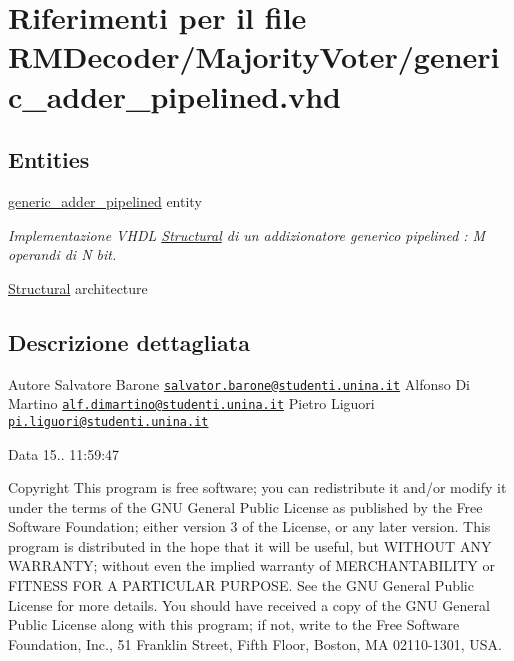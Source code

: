 \hypertarget{generic__adder__pipelined_8vhd}{\section{Riferimenti per il file R\+M\+Decoder/\+Majority\+Voter/generic\+\_\+adder\+\_\+pipelined.vhd}
\label{generic__adder__pipelined_8vhd}
}
\subsection*{Entities}
\begin{DoxyCompactItemize}
\item 
\hyperlink{classgeneric__adder__pipelined}{generic\+\_\+adder\+\_\+pipelined} entity
\begin{DoxyCompactList}\small\item\em Implementazione V\+H\+D\+L \hyperlink{classgeneric__adder__pipelined_1_1_structural}{Structural} di un addizionatore generico pipelined \+: M operandi di N bit. \end{DoxyCompactList}\item 
\hyperlink{classgeneric__adder__pipelined_1_1_structural}{Structural} architecture
\end{DoxyCompactItemize}


\subsection{Descrizione dettagliata}
\begin{DoxyAuthor}{Autore}
Salvatore Barone \href{mailto:salvator.barone@studenti.unina.it}{\tt salvator.\+barone@studenti.\+unina.\+it} Alfonso Di Martino \href{mailto:alf.dimartino@studenti.unina.it}{\tt alf.\+dimartino@studenti.\+unina.\+it} Pietro Liguori \href{mailto:pi.liguori@studenti.unina.it}{\tt pi.\+liguori@studenti.\+unina.\+it} 
\end{DoxyAuthor}
\begin{DoxyDate}{Data}
15.. 11\+:59\+:47
\end{DoxyDate}
\begin{DoxyCopyright}{Copyright}
This program is free software; you can redistribute it and/or modify it under the terms of the G\+N\+U General Public License as published by the Free Software Foundation; either version 3 of the License, or any later version. This program is distributed in the hope that it will be useful, but W\+I\+T\+H\+O\+U\+T A\+N\+Y W\+A\+R\+R\+A\+N\+T\+Y; without even the implied warranty of M\+E\+R\+C\+H\+A\+N\+T\+A\+B\+I\+L\+I\+T\+Y or F\+I\+T\+N\+E\+S\+S F\+O\+R A P\+A\+R\+T\+I\+C\+U\+L\+A\+R P\+U\+R\+P\+O\+S\+E. See the G\+N\+U General Public License for more details. You should have received a copy of the G\+N\+U General Public License along with this program; if not, write to the Free Software Foundation, Inc., 51 Franklin Street, Fifth Floor, Boston, M\+A 02110-\/1301, U\+S\+A. 
\end{DoxyCopyright}
